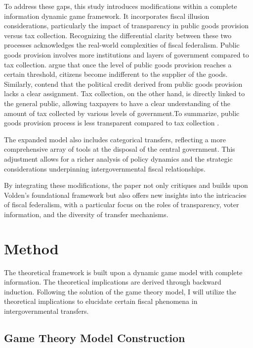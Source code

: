 To address these gaps, this study introduces modifications within a complete information dynamic game framework. It incorporates fiscal illusion considerations, particularly the impact of transparency in public goods provision versus tax collection. Recognizing the differential clarity between these two processes acknowledges the real-world complexities of fiscal federalism. Public goods provision involves more institutions and layers of government compared to tax collection. \Textcite{bednar2007credit} argue that once the level of public goods provision reaches a certain threshold, citizens become indifferent to the supplier of the goods. Similarly, \Textcite{nicholson2011claiming} contend that the political credit derived from public goods provision lacks a clear assignment. Tax collection, on the other hand, is directly linked to the general public, allowing taxpayers to have a clear understanding of the amount of tax collected by various levels of government.To summarize, public goods provision process is less transparent compared to tax collection \parencite{mcgillivray2019aid,pommerehne1978fiscal, cepparulo2019public}.

The expanded model also includes categorical transfers, reflecting a more comprehensive array of tools at the disposal of the central government. This adjustment allows for a richer analysis of policy dynamics and the strategic considerations underpinning intergovernmental fiscal relationships.

By integrating these modifications, the paper not only critiques and builds upon Volden's foundational framework but also offers new insights into the intricacies of fiscal federalism, with a particular focus on the roles of transparency, voter information, and the diversity of transfer mechanisms.


\section{Method}
The theoretical framework is built upon a dynamic game model with complete information. The theoretical implications are derived through backward induction. Following the solution of the game theory model, I will utilize the theoretical implications to elucidate certain fiscal phenomena in intergovernmental transfers.


\subsection{Game Theory Model Construction}


